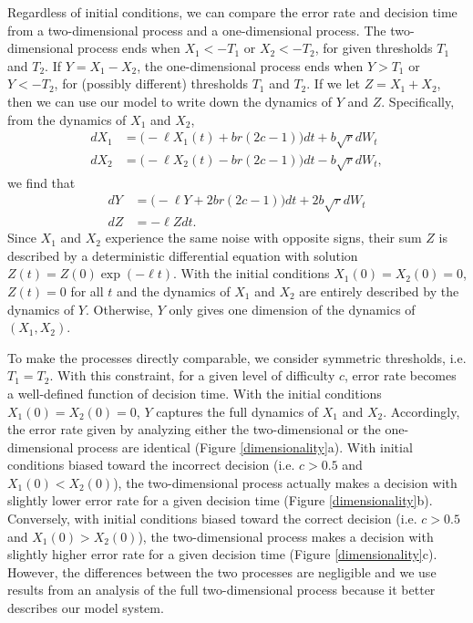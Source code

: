 \documentclass{article}
\begin{document}
Regardless of initial conditions, we can compare the error rate and decision time from a two-dimensional process and a one-dimensional process.  The two-dimensional process ends when $X_1<-T_1$ or $X_2<-T_2$, for given thresholds $T_1$ and $T_2$. If $Y=X_1-X_2$, the one-dimensional process ends when $Y>T_1$ or $Y<-T_2$, for (possibly different) thresholds $T_1$ and $T_2$.
If we let $Z=X_1+X_2$, then we can use our model to write down the dynamics of $Y$ and $Z$. Specifically, from the dynamics of $X_1$ and $X_2$,
\begin{equation*}
\begin{array}{ll}
dX_1&=\bigg(-\ell X_1(t)+br(2c-1)\bigg)dt+b\sqrt{r}dW_{t}
\\dX_2&=\bigg(-\ell X_2(t)-br(2c-1)\bigg)dt-b\sqrt{r}dW_{t},
\end{array}
\end{equation*}
we find that 
\begin{equation*}
\begin{array}{ll}
dY&=\bigg(-\ell Y+2br(2c-1)\bigg)dt+2b\sqrt{r}dW_{t}
\\dZ&=-\ell Zdt.
\end{array}
\end{equation*}
Since $X_1$ and $X_2$ experience the same noise with opposite signs, their sum $Z$ is described by a deterministic differential equation with solution $Z(t)=Z(0)\exp(-\ell t)$. With the initial conditions $X_1(0)=X_2(0)=0$, $Z(t)=0$ for all $t$ and the dynamics of $X_1$ and $X_2$ are entirely described by the dynamics of $Y$. Otherwise, $Y$ only gives one dimension of the dynamics of $(X_1,X_2)$. 

 To make the processes directly comparable, we consider symmetric thresholds, i.e. $T_1=T_2$.
With this constraint, for a given level of difficulty $c$, error rate becomes a well-defined function of decision time. 
With the initial conditions $X_1(0)=X_2(0)=0$, $Y$ captures the full dynamics of $X_1$ and $X_2$. Accordingly, the error rate given by analyzing either the two-dimensional or the one-dimensional process are identical (Figure \ref{dimensionality}a). With initial conditions biased toward the incorrect decision (i.e. $c>0.5$ and $X_1(0)<X_2(0)$), the two-dimensional process actually makes a decision with slightly lower error rate for a given decision time (Figure \ref{dimensionality}b).  Conversely, with initial conditions biased toward the correct decision (i.e. $c>0.5$ and $X_1(0)>X_2(0)$), the two-dimensional process makes a decision with slightly higher error rate for a given decision time (Figure \ref{dimensionality}c). However, the differences between the two processes are negligible and we use results from an analysis of the full two-dimensional process because it better describes our model system. 
\end{document}
